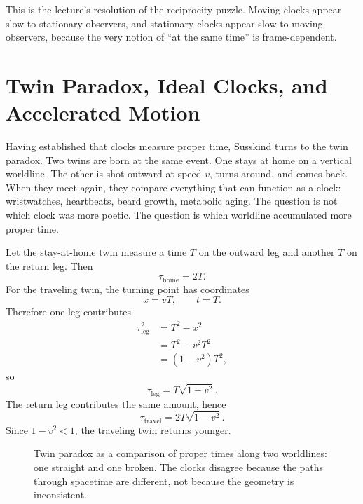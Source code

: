 This is the lecture's resolution of the reciprocity puzzle. Moving clocks appear slow to stationary observers, and stationary clocks appear slow to moving observers, because the very notion of ``at the same time'' is frame-dependent.

\section{Twin Paradox, Ideal Clocks, and Accelerated Motion}

Having established that clocks measure proper time, Susskind turns to the twin paradox. Two twins are born at the same event. One stays at home on a vertical worldline. The other is shot outward at speed \(v\), turns around, and comes back. When they meet again, they compare everything that can function as a clock: wristwatches, heartbeats, beard growth, metabolic aging. The question is not which clock was more poetic. The question is which worldline accumulated more proper time.

Let the stay-at-home twin measure a time \(T\) on the outward leg and another \(T\) on the return leg. Then
\begin{equation}
\tau_{\mathrm{home}}=2T.
\end{equation}
For the traveling twin, the turning point has coordinates
\begin{equation}
x=vT, \qquad t=T.
\end{equation}
Therefore one leg contributes
\begin{align}
\tau_{\mathrm{leg}}^2 &= T^2-x^2 \\
&= T^2-v^2T^2 \\
&= (1-v^2)T^2,
\end{align}
so
\begin{equation}
\tau_{\mathrm{leg}}=T\sqrt{1-v^2}.
\end{equation}
The return leg contributes the same amount, hence
\begin{equation}
\tau_{\mathrm{travel}}=2T\sqrt{1-v^2}.
\end{equation}
Since \(1-v^2<1\), the traveling twin returns younger.

\begin{figure}[h]
\centering
{}
\caption{Twin paradox as a comparison of proper times along two worldlines: one straight and one broken. The clocks disagree because the paths through spacetime are different, not because the geometry is inconsistent.}
\end{figure}


